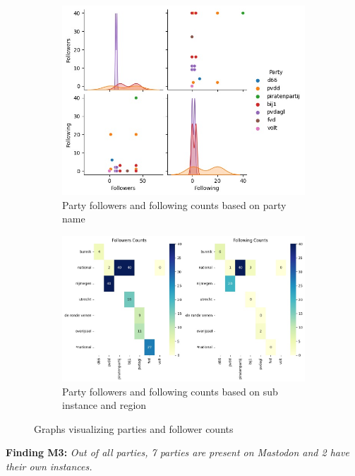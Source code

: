 \begin{figure}[ht]
  \centering
  \begin{subfigure}[h]{.49\linewidth}
    \includegraphics[width=\textwidth]{media/parties-following-counts.jpeg}
    \captionsetup{justification=centering}
    \caption{Party followers and following counts based on party name}
    \label{fig:partyfollowers}
  \end{subfigure}
  \begin{subfigure}[h]{.49\linewidth}
      \captionsetup{justification=centering}
      \includegraphics[width=\textwidth]{media/parties-following-region-counts.jpeg}
      \caption{Party followers and following counts based on sub instance and region}
      \label{fig:partyfollowingregions}
  \end{subfigure}
  \caption{Graphs visualizing parties and follower counts}
  \label{fig:partyfollowerstotal}
\end{figure}


\textbf{Finding M3:} \textit{Out of all parties, 7 parties are present on Mastodon and 2 have their own instances.}
